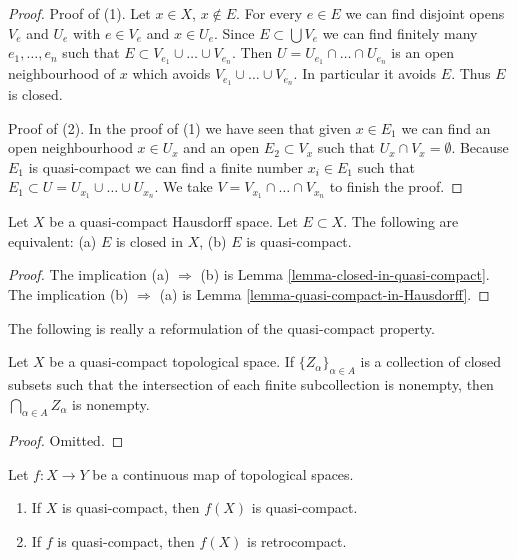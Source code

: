 \begin{proof}
Proof of (1). Let $x \in X$, $x \not \in E$.
For every $e \in E$ we can find disjoint opens $V_e$ and $U_e$
with $e \in V_e$ and $x \in U_e$. Since $E \subset \bigcup V_e$
we can find finitely many $e_1, \ldots, e_n$ such that
$E \subset V_{e_1} \cup \ldots \cup V_{e_n}$. Then
$U = U_{e_1} \cap \ldots \cap U_{e_n}$ is an open neighbourhood
of $x$ which avoids $V_{e_1} \cup \dots \cup V_{e_n}$. In particular
it avoids $E$. Thus $E$ is closed.

\medskip\noindent
Proof of (2). In the proof of (1) we have seen that given $x \in E_1$
we can find an open neighbourhood $x \in U_x$ and an open
$E_2 \subset V_x$ such that $U_x \cap V_x = \emptyset$. Because
$E_1$ is quasi-compact we can find a finite number $x_i \in E_1$
such that $E_1 \subset U = U_{x_1} \cup \ldots \cup U_{x_n}$.
We take $V = V_{x_1} \cap \ldots \cap V_{x_n}$ to finish the proof.
\end{proof}

\begin{lemma}
\label{lemma-closed-in-compact}
Let $X$ be a quasi-compact Hausdorff space. Let $E \subset X$.
The following are equivalent: (a) $E$ is closed in $X$, (b)
$E$ is quasi-compact.
\end{lemma}

\begin{proof}
The implication (a) $\Rightarrow$ (b) is
Lemma \ref{lemma-closed-in-quasi-compact}.
The implication (b) $\Rightarrow$ (a) is
Lemma \ref{lemma-quasi-compact-in-Hausdorff}.
\end{proof}

\noindent
The following is really a reformulation of the
quasi-compact property.

\begin{lemma}
\label{lemma-intersection-closed-in-quasi-compact}
Let $X$ be a quasi-compact topological space.
If $\{Z_\alpha\}_{\alpha \in A}$ is a collection of closed subsets
such that the intersection of each finite subcollection
is nonempty, then $\bigcap_{\alpha \in A} Z_\alpha$ is nonempty.
\end{lemma}

\begin{proof}
Omitted.
\end{proof}

\begin{lemma}
\label{lemma-image-quasi-compact}
Let $f : X \to Y$ be a continuous map of topological spaces.
\begin{enumerate}
\item If $X$ is quasi-compact, then $f(X)$ is quasi-compact.
\item If $f$ is quasi-compact, then $f(X)$ is retrocompact.
\end{enumerate}
\end{lemma}

